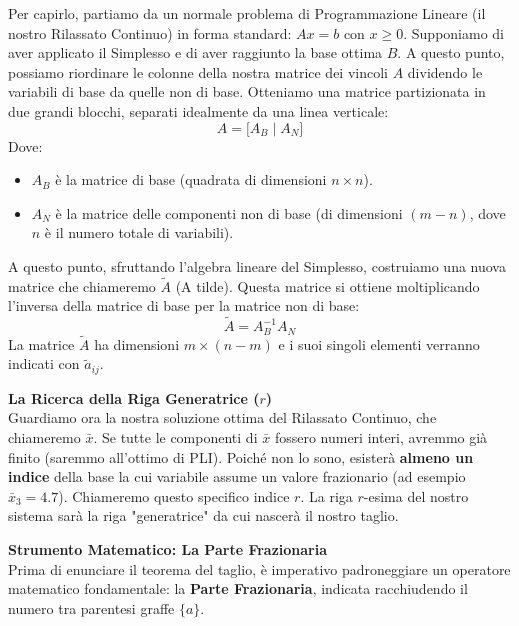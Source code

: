 \documentclass[12pt, a4paper]{article}
\newcommand{\separatore}{\noindent{\color{titlecolor!50}\rule{\textwidth}{0.6pt}}}
\begin{document}
	Per capirlo, partiamo da un normale problema di Programmazione Lineare (il nostro Rilassato Continuo) in forma standard: $Ax = b$ con $x \geq 0$.
	Supponiamo di aver applicato il Simplesso e di aver raggiunto la base ottima $B$. A questo punto, possiamo riordinare le colonne della nostra matrice dei vincoli $A$ dividendo le variabili di base da quelle non di base. 
	Otteniamo una matrice partizionata in due grandi blocchi, separati idealmente da una linea verticale:
	\[
	A = \big[ A_B \mid A_N \big]
	\]
	Dove:
	\begin{itemize}[label=\textcolor{titlecolor}{\Large\textbullet}, itemsep=2pt, leftmargin=1.5cm]
		\item $A_B$ è la matrice di base (quadrata di dimensioni $n \times n$).
		\item $A_N$ è la matrice delle componenti non di base (di dimensioni $(m-n)$, dove $n$ è il numero totale di variabili).
	\end{itemize}
	
	A questo punto, sfruttando l'algebra lineare del Simplesso, costruiamo una nuova matrice che chiameremo $\tilde{A}$ (A tilde). Questa matrice si ottiene moltiplicando l'inversa della matrice di base per la matrice non di base:
	\[
	\tilde{A} = A_B^{-1} A_N
	\]
	La matrice $\tilde{A}$ ha dimensioni $m \times (n-m)$ e i suoi singoli elementi verranno indicati con $\tilde{a}_{ij}$.
	
	\vspace{0.4cm}
	\textbf{La Ricerca della Riga Generatrice ($r$)}\\
	Guardiamo ora la nostra soluzione ottima del Rilassato Continuo, che chiameremo $\bar{x}$.
	Se tutte le componenti di $\bar{x}$ fossero numeri interi, avremmo già finito (saremmo all'ottimo di PLI). Poiché non lo sono, esisterà \textbf{almeno un indice} della base la cui variabile assume un valore frazionario (ad esempio $\bar{x}_3 = 4.7$). 
	Chiameremo questo specifico indice \textbf{$r$}. La riga $r$-esima del nostro sistema sarà la riga "generatrice" da cui nascerà il nostro taglio.
	
	\vspace{0.6cm}
	\separatore
	\vspace{0.4cm}
	
	\textbf{Strumento Matematico: La Parte Frazionaria}\\
	Prima di enunciare il teorema del taglio, è imperativo padroneggiare un operatore matematico fondamentale: la \textbf{Parte Frazionaria}, indicata racchiudendo il numero tra parentesi graffe $\{a\}$.
	
\end{document}
